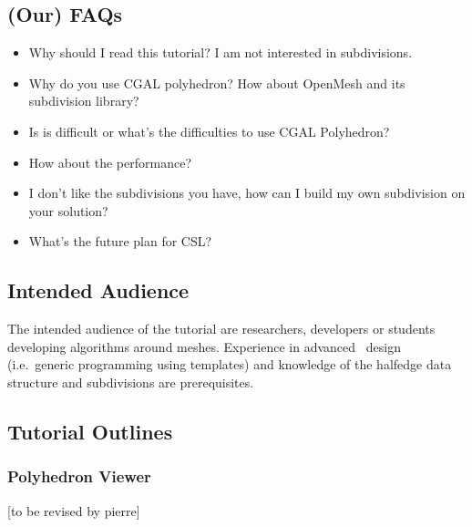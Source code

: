 \documentclass[letter,twocolumn]{article}
\begin{document}
\subsection*{(Our) FAQs}

\begin{itemize}
\item Why should I read this tutorial? I am not interested in subdivisions. 
\item Why do you use CGAL polyhedron? How about OpenMesh and its 
subdivision library?
\item Is is difficult or what's the difficulties to use CGAL Polyhedron?
\item How about the performance?
\item I don't like the subdivisions you have, how can I build my own 
subdivision on your solution?
\item What's the future plan for CSL? 
\end{itemize}

\subsection*{Intended Audience}

The intended audience of the tutorial are researchers, developers or
students developing algorithms around meshes. Experience in advanced
\CC\ design (i.e.\ generic programming using templates) and knowledge
of the halfedge data structure and subdivisions are prerequisites.


\subsection*{Tutorial Outlines}

\subsubsection*{Polyhedron Viewer}
[to be revised by pierre]
\end{document}

